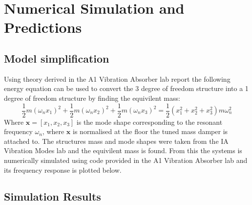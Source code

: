 \documentclass[8pt]{article}
\begin{document}
\newpage

\vspace{-14pt}
\section{Numerical Simulation and Predictions}
\vspace{-14pt}
\subsection{Model simplification}
\vspace{-14pt}

Using theory derived in the A1 Vibration Absorber lab report the following energy equation can be used to convert
the 3 degree of freedom structure into a 1 degree of freedom structure by finding the equivilent mass:
\begin{equation}
    \frac{1}{2}m(\omega_n x_1)^2 + \frac{1}{2}m(\omega_n x_2)^2 + \frac{1}{2}m(\omega_n x_3)^2 = \frac{1}{2}(x_1^2+x_2^2+x_3^2)m \omega_n^2
\end{equation}
Where $\bm{x} = [x_1, x_2, x_3]$ is the mode shape corresponding to the resonant frequency $\omega_n$, where $\bm{x}$
is normalised at the floor the tuned mass damper is attached to. The structures mass and mode shapes were taken from the 
IA Vibration Modes lab and the equivilent mass is found. From this the systems is numerically simulated using code provided
in the A1 Vibration Absorber lab and its frequency response is plotted below.

\vspace{-14pt}
\subsection{Simulation Results}
\vspace{-14pt}
\end{document}
